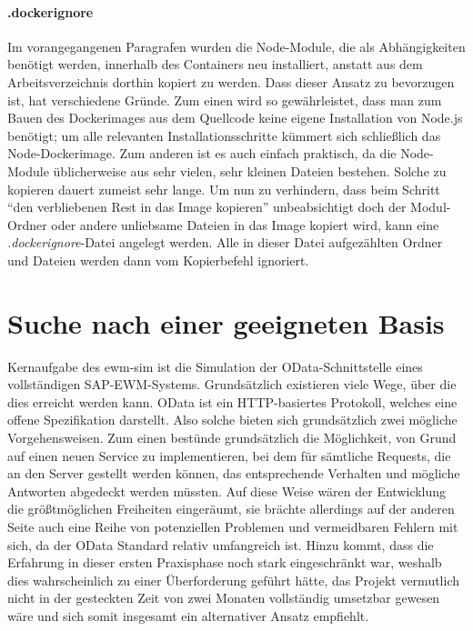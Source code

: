 \paragraph{.dockerignore}
Im vorangegangenen Paragrafen wurden die Node-Module, die als Abhängigkeiten benötigt werden, innerhalb des Containers neu installiert, anstatt aus dem Arbeitsverzeichnis dorthin kopiert zu werden.
Dass dieser Ansatz zu bevorzugen ist, hat verschiedene Gründe.
Zum einen wird so gewährleistet, dass man zum Bauen des Dockerimages aus dem Quellcode keine eigene Installation von Node.js benötigt; um alle relevanten Installationsschritte kümmert sich schließlich das Node-Dockerimage.
Zum anderen ist es auch einfach praktisch, da die Node-Module üblicherweise aus sehr vielen, sehr kleinen Dateien bestehen.
Solche zu kopieren dauert zumeist sehr lange.
Um nun zu verhindern, dass beim Schritt \enquote{den verbliebenen Rest in das Image kopieren} unbeabsichtigt doch der Modul-Ordner oder andere unliebsame Dateien in das Image kopiert wird, kann eine \emph{.dockerignore}-Datei angelegt werden.
Alle in dieser Datei aufgezählten Ordner und Dateien werden dann vom Kopierbefehl ignoriert.



\section{Suche nach einer geeigneten Basis}
Kernaufgabe des \ac{ewm-sim} ist die Simulation der \ac{OData}-Schnittstelle eines vollständigen SAP-\ac{EWM}-Systems.
Grundsätzlich existieren viele Wege, über die dies erreicht werden kann.
\ac{OData} ist ein \ac{HTTP}-basiertes Protokoll, welches eine offene Spezifikation darstellt.
Also solche bieten sich grundsätzlich zwei mögliche Vorgehensweisen.
Zum einen bestünde grundsätzlich die Möglichkeit, von Grund auf einen neuen Service zu implementieren, bei dem für sämtliche Requests, die an den Server gestellt werden können, das entsprechende Verhalten und mögliche Antworten abgedeckt werden müssten.
Auf diese Weise wären der Entwicklung die größtmöglichen Freiheiten eingeräumt, sie brächte allerdings auf der anderen Seite auch eine Reihe von potenziellen Problemen und vermeidbaren Fehlern mit sich, da der \ac{OData} Standard relativ umfangreich ist.
Hinzu kommt, dass die Erfahrung in dieser ersten Praxisphase noch stark eingeschränkt war, weshalb dies wahrscheinlich zu einer Überforderung geführt hätte, das Projekt vermutlich nicht in der gesteckten Zeit von zwei Monaten vollständig umsetzbar gewesen wäre und sich somit insgesamt ein alternativer Ansatz empfiehlt.

